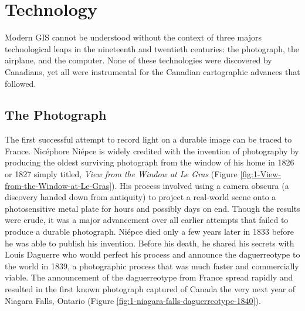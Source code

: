 \documentclass[
]{book}
\begin{document}
\hypertarget{technology}{%
\section{Technology}\label{technology}}

Modern GIS cannot be understood without the context of three majors technological leaps in the nineteenth and twentieth centuries: the photograph, the airplane, and the computer. None of these technologies were discovered by Canadians, yet all were instrumental for the Canadian cartographic advances that followed.

\hypertarget{the-photograph}{%
\subsection{The Photograph}\label{the-photograph}}

The first successful attempt to record light on a durable image can be traced to France. Nicéphore Niépce is widely credited with the invention of photography by producing the oldest surviving photograph from the window of his home in 1826 or 1827 simply titled, \emph{View from the Window at Le Gras} (Figure \ref{fig:1-View-from-the-Window-at-Le-Gras}). His process involved using a camera obscura (a discovery handed down from antiquity) to project a real-world scene onto a photosensitive metal plate for hours and possibly days on end. Though the results were crude, it was a major advancement over all earlier attempts that failed to produce a durable photograph. Niépce died only a few years later in 1833 before he was able to publish his invention. Before his death, he shared his secrets with Louis Daguerre who would perfect his process and announce the daguerreotype to the world in 1839, a photographic process that was much faster and commercially viable. The announcement of the daguerreotype from France spread rapidly and resulted in the first known photograph captured of Canada the very next year of Niagara Falls, Ontario (Figure \ref{fig:1-niagara-falls-daguerreotype-1840}).
\end{document}
